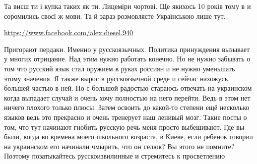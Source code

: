 Та виєш ти і купка таких як ти. Лицеміри чортові. Ще якихось 10 років тому в и
соромились своєї ж мови. Та й зараз розмовляєте Українською лише тут.


\url{https://www.facebook.com/alex.diesel.940}\par

Пригорают пердаки. Именно у русскоязычных. Политика принуждения вызывает у
многих отрицание. Над этим нужно работать конечно. Но не нужно забывать о том
что русский язык стал оружием в руках россиян и не нужно уменьшать этому
значения. Я также вырос в русскоязычной среде и сейчас нахожусь большей частью
в ней. Но с большой радостью стараюсь отвечать на украинском когда выпадает
случай и очень хочу полностью на него перейти. Ведь в этом нет ничего плохого
только плюсы. Затем освоить до какой-то степени ещё несколько языков ведь это
прекрасно и очень тренерует наш ленивый мозг. Такие посты о том, что тут
начинают гнобить русскую речь меня просто выбешивают. Где вы были, когда во
времена моего школьного возраста, в Киеве, если ребенок говорил на украинском
его начинали чмырить, что он селюк? Вы этого не помните? Поэтому позатыкайтесь
русскоизвилинные и стремитесь к просветлению

